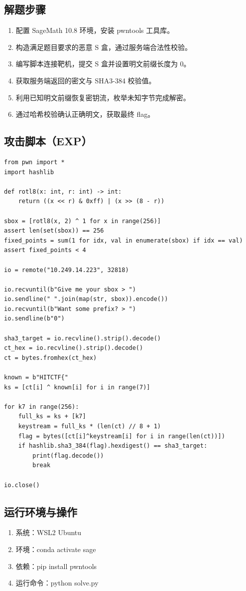\documentclass[12pt,a4paper,UTF8]{ctexart}
\begin{document}
\subsection{解题步骤}
\begin{enumerate}[itemsep=3pt, parsep=0pt]
    \item 配置 SageMath 10.8 环境，安装 pwntools 工具库。
    \item 构造满足题目要求的恶意 S 盒，通过服务端合法性校验。
    \item 编写脚本连接靶机，提交 S 盒并设置明文前缀长度为 0。
    \item 获取服务端返回的密文与 SHA3-384 校验值。
    \item 利用已知明文前缀恢复密钥流，枚举未知字节完成解密。
    \item 通过哈希校验确认正确明文，获取最终 flag。
\end{enumerate}

\subsection{攻击脚本（EXP）}
\begin{lstlisting}
from pwn import *
import hashlib

def rotl8(x: int, r: int) -> int:
    return ((x << r) & 0xff) | (x >> (8 - r))

sbox = [rotl8(x, 2) ^ 1 for x in range(256)]
assert len(set(sbox)) == 256
fixed_points = sum(1 for idx, val in enumerate(sbox) if idx == val)
assert fixed_points < 4

io = remote("10.249.14.223", 32818)

io.recvuntil(b"Give me your sbox > ")
io.sendline(" ".join(map(str, sbox)).encode())
io.recvuntil(b"Want some prefix? > ")
io.sendline(b"0")

sha3_target = io.recvline().strip().decode()
ct_hex = io.recvline().strip().decode()
ct = bytes.fromhex(ct_hex)

known = b"HITCTF{"
ks = [ct[i] ^ known[i] for i in range(7)]

for k7 in range(256):
    full_ks = ks + [k7]
    keystream = full_ks * (len(ct) // 8 + 1)
    flag = bytes([ct[i]^keystream[i] for i in range(len(ct))])
    if hashlib.sha3_384(flag).hexdigest() == sha3_target:
        print(flag.decode())
        break

io.close()
\end{lstlisting}

\subsection{运行环境与操作}
\begin{enumerate}[itemsep=3pt, parsep=0pt]
    \item 系统：WSL2 Ubuntu
    \item 环境：conda activate sage
    \item 依赖：pip install pwntools
    \item 运行命令：python solve.py
\end{enumerate}
\end{document}
